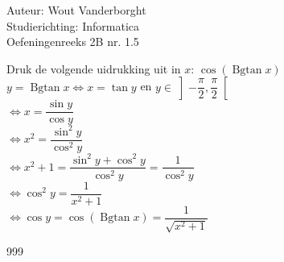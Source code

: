 \documentclass[a4paper]{article}
\newcommand{\Bgtan}{\operatorname{Bgtan}}
\begin{document}
  
\noindent \large Auteur: Wout Vanderborght\\
\noindent \large Studierichting: Informatica\\
\noindent \large Oefeningenreeks 2B nr. 1.5\\

\medskip

\normalsize

Druk de volgende uidrukking uit in $x$: $\cos(\Bgtan x)$ \\

$ y = \Bgtan x \Leftrightarrow x = \tan y $ en $ y \in \left]-\dfrac{\pi}{2}, \dfrac{\pi}{2}\right[ $ \\

$ \Leftrightarrow x = \dfrac{\sin y}{\cos y} $ \\

$ \Leftrightarrow x^2 = \dfrac{\sin^2 y}{\cos^2 y} $ \\

$ \Leftrightarrow x^2 + 1 = \dfrac{\sin^2 y + \cos^2 y}{\cos^2 y} = \dfrac{1}{\cos^2 y} $ \\

$ \Leftrightarrow \cos^2 y = \dfrac{1}{x^2 + 1} $ \\

$ \Leftrightarrow \cos y = \cos(\Bgtan x) = \dfrac{1}{\sqrt{x^2 + 1}} $ \\

\begin{thebibliography}{999}
\end{thebibliography}
\end{document}
